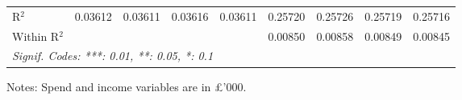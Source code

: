 \begin{table}[htbp]
\begin{threeparttable}[b]
\begin{tabular}{lcccccccc}
         R$^2$                    & 0.03612         & 0.03611         & 0.03616         & 0.03611         & 0.25720         & 0.25726         & 0.25719         & 0.25716\\  
         Within R$^2$             &                 &                 &                 &                 & 0.00850         & 0.00858         & 0.00849         & 0.00845\\  
         \midrule \midrule
         \multicolumn{9}{l}{\emph{Signif. Codes: ***: 0.01, **: 0.05, *: 0.1}}\\
      \end{tabular}
      
      \begin{tablenotes}\footnotesize
         \item Notes: Spend and income variables are in \pounds'000.
      \end{tablenotes}
   \end{threeparttable}
\end{table}


